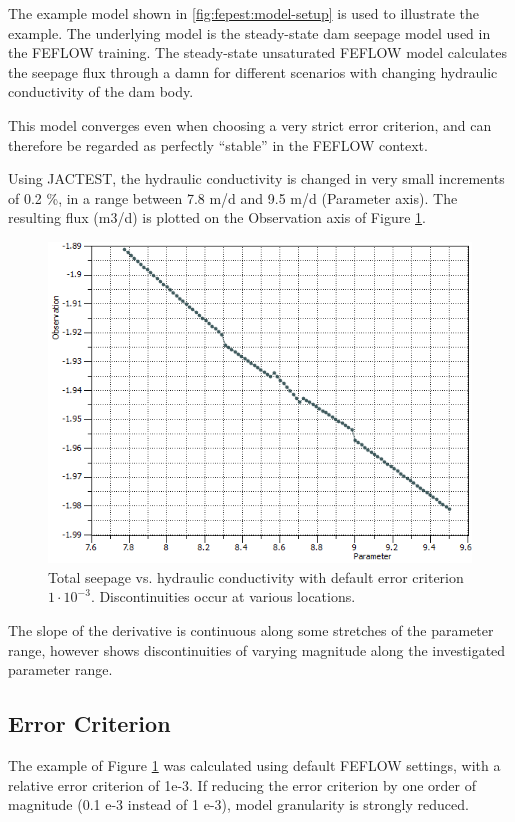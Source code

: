 The example model shown in \ref{fig:fepest:model-setup} is used to illustrate the example. The underlying model is the steady-state dam seepage model used in the FEFLOW training. The steady-state unsaturated FEFLOW model calculates the seepage flux through a damn for different scenarios with changing hydraulic conductivity of the dam body.

This model converges even when choosing a very strict error criterion, and can therefore be regarded as perfectly “stable” in the FEFLOW context.

Using JACTEST, the hydraulic conductivity is changed in very small increments of 0.2 \%, in a range between 7.8 m/d and 9.5 m/d (Parameter axis). The resulting flux (m3/d) is plotted on the Observation axis of Figure \ref{fig:fepest:stabil-con-body-e1-3_100it}. 

\begin{figure}
	\center
	\includegraphics[width=\columnwidth]{figures/stabil-con-body-e1-3_100it.png}
\caption{Total seepage vs. hydraulic conductivity with default error criterion $1 \cdot 10^{-3}$. Discontinuities occur at various locations.}
\label{fig:fepest:stabil-con-body-e1-3_100it}
\end{figure}

The slope of the derivative is continuous along some stretches of the parameter range, however shows discontinuities of varying magnitude along the investigated parameter range. 

\subsection{Error Criterion}
The example of Figure \ref{fig:fepest:stabil-con-body-e1-3_100it} was calculated using default FEFLOW settings, with a relative error criterion of 1e-3. If reducing the error criterion by one order of magnitude (0.1 e-3 instead of 1 e-3), model granularity is strongly reduced.

